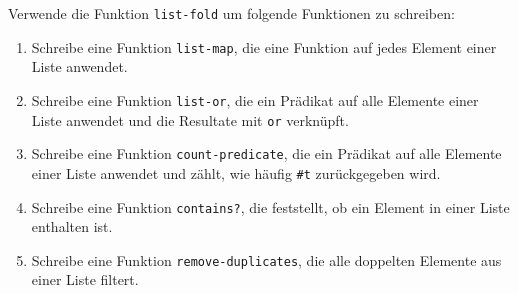 \begin{aufgabe}
  Verwende die Funktion \texttt{list-fold} um folgende 
  Funktionen zu schreiben:
  \begin{enumerate}
  \item Schreibe eine Funktion \texttt{list-map}, die eine Funktion auf jedes
    Element einer Liste anwendet.
  \item Schreibe eine Funktion \texttt{list-or}, die ein Prädikat auf alle
    Elemente einer Liste anwendet und die Resultate mit \texttt{or}
    verknüpft.
  \item Schreibe eine Funktion \texttt{count-predicate}, die ein Prädikat auf
    alle Elemente einer Liste anwendet und zählt, wie häufig \verb|#t|
    zurückgegeben wird.
  \item Schreibe eine Funktion \texttt{contains?}, die feststellt, ob ein
    Element in einer Liste enthalten ist.
  \item Schreibe eine Funktion \texttt{remove-duplicates}, die alle doppelten
    Elemente aus einer Liste filtert.
  \end{enumerate}
\end{aufgabe}

